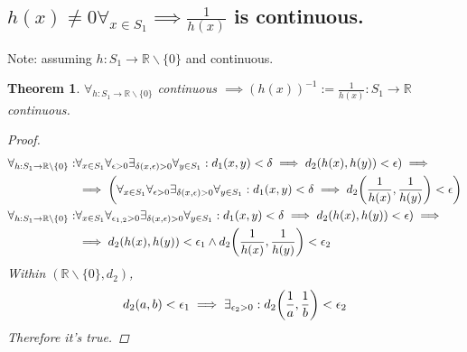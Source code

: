 \documentclass[]{article}
\newcommand{\R}{\mathbb{R}}
\newtheorem{theorem}{Theorem}
\begin{document}
\subsection{$h(x) \neq 0 \forall_{x\in S_1} \implies \frac{1}{h(x)}$ is continuous.}
Note: assuming $h : S_1 \to \R \backslash \{0\}$ and continuous.
\begin{theorem}
    $\forall_{h : S_1 \to \R \backslash \{0\}}$ continuous $\implies (h(x))^{-1} := \frac{1}{h(x)}: S_1 \to \R$ continuous.
    \begin{proof}
        \begin{align*}
            \forall_{h : S_1 \to \R \backslash \{0\}} : 
                &\forall_{x\in S_1} \forall_{\epsilon>0} \exists_{\delta(x,\epsilon)>0} \forall_{y\in S_1} : d_1(x,y) < \delta \implies d_2(h(x),h(y)) < \epsilon) \implies\\
                &\implies \qty(\forall_{x\in S_1} \forall_{\epsilon>0} \exists_{\delta(x,\epsilon)>0} \forall_{y\in S_1} : d_1(x,y) < \delta \implies d_2\qty(\frac{1}{h(x)},\frac{1}{h(y)}) < \epsilon)\\
            \forall_{h : S_1 \to \R \backslash \{0\}} :
                &\forall_{x\in S_1} \forall_{\epsilon_{1,2}>0} \exists_{\delta(x,\epsilon)>0} \forall_{y\in S_1} : d_1(x,y) < \delta \implies d_2(h(x),h(y)) < \epsilon) \implies\\
                &\implies d_2(h(x),h(y)) < \epsilon_1 \land d_2\qty(\frac{1}{h(x)},\frac{1}{h(y)})< \epsilon_2
        \end{align*}
        Within $(\R \backslash \{0\}, d_2)$, 
        $$d_2(a,b) < \epsilon_1 \implies \exists_{\epsilon_2>0} : d_2 \qty(\frac{1}{a}, \frac{1}{b}) < \epsilon_2$$
        Therefore it's true.
    \end{proof}
\end{theorem}


\newpage
\end{document}
